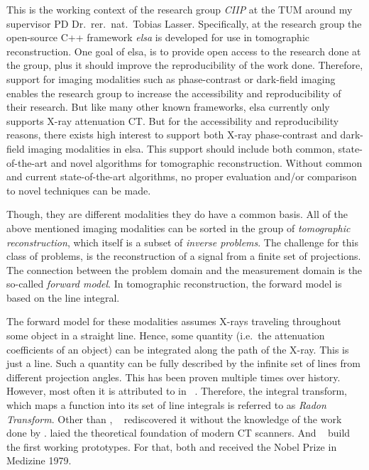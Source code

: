 This is the working context of the research group \textit{\gls{CIIP}} at the \gls{TUM} around my
supervisor PD Dr.\ rer.\ nat.\ Tobias Lasser. Specifically, at the research group the open-source
C++ framework \textit{elsa} is developed for use in tomographic reconstruction. One goal of elsa, is
to provide open access to the research done at the group, plus it should improve the reproducibility
of the work done. Therefore, support for imaging modalities such as phase-contrast or dark-field
imaging enables the research group to increase the accessibility and reproducibility of their
research. But like many other known frameworks, elsa currently only supports X-ray attenuation CT\@.
But for the accessibility and reproducibility reasons, there exists high interest to support both
X-ray phase-contrast and dark-field imaging modalities in elsa. This support should include both
common, state-of-the-art and novel algorithms for tomographic reconstruction. Without common and
current state-of-the-art algorithms, no proper evaluation and/or comparison to novel techniques can
be made.

Though, they are different modalities they do have a common basis. All of the above mentioned
imaging modalities can be sorted in the group of \textit{tomographic reconstruction}, which itself
is a subset of \textit{inverse problems}. The challenge for this class of problems, is the
reconstruction of a signal from a finite set of projections. The connection between the problem
domain and the measurement domain is the so-called \textit{forward model}. In tomographic
reconstruction, the forward model is based on the line integral.

The forward model for these modalities assumes X-rays traveling throughout some object in a straight
line. Hence, some quantity (i.e.\ the attenuation coefficients of an object) can be integrated along
the path of the X-ray. This is just a line. Such a quantity can be fully described by the infinite
set of lines from different projection angles. This has been proven multiple times over history.
However, most often it is attributed to \citeauthor*{radon_uber_1917} in \citeyear{radon_uber_1917}
~\cite{radon_user_1917}. Therefore, the integral transform, which maps a function into its set of
line integrals is referred to as \textit{Radon Transform}. Other than \citeauthor*{radon_uber_1917},
\citeauthor*{cormack_representation_1963}~\cite{cormack_representation_1963} rediscovered it without
the knowledge of the work done by \citeauthor*{radon_uber_1917}.
\citeauthor*{cormack_representation_1963} laied the theoretical foundation of modern CT scanners.
And \citeauthor*{hounsfield_computerized_1973}~\cite{hounsfield_computerized_1973} build the first
working prototypes. For that, both \citeauthor*{cormack_representation_1963} and
\citeauthor*{hounsfield_computerized_1973} received the Nobel Prize in Medizine 1979.

